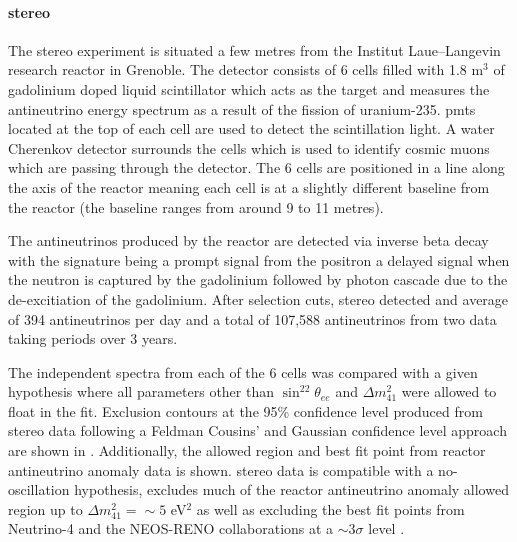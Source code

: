 \newpage
\paragraph{\gls{stereo}}
The \gls{stereo} experiment is situated a few metres from the Institut Laue–Langevin research reactor in Grenoble. The detector consists of 6 cells filled with 1.8 m$^3$ of gadolinium doped liquid scintillator which acts as the target and measures the antineutrino energy spectrum as a result of the fission of uranium-235. \glspl{pmt} located at the top of each cell are used to detect the scintillation light. A water Cherenkov detector surrounds the cells which is used to identify cosmic muons which are passing through the detector. The 6 cells are positioned in a line along the axis of the reactor meaning each cell is at a slightly different baseline from the reactor (the baseline ranges from around 9 to 11 metres). 

The antineutrinos produced by the reactor are detected via inverse beta decay with the signature being a prompt signal from the positron a delayed signal when the neutron is captured by the gadolinium followed by photon cascade due to the de-excitiation of the gadolinium. After selection cuts, \gls{stereo} detected and average of 394 antineutrinos per day and a total of 107,588 antineutrinos from two data taking periods over 3 years.  

The independent spectra from each of the 6 cells was compared with a given hypothesis where all parameters other than $\sin^22\theta_{ee}$ and $\Delta m^2_{41}$ were allowed to float in the fit. Exclusion contours at the 95\% confidence level produced from \gls{stereo} data following a Feldman Cousins' and Gaussian confidence level approach are shown in . Additionally, the allowed region and best fit point from reactor antineutrino anomaly data is shown. \gls{stereo} data is compatible with a no-oscillation hypothesis, excludes much of the reactor antineutrino anomaly allowed region up to $\Delta m^2_{41} = \sim 5$ eV$^2$ as well as excluding the best fit points from Neutrino-4 and the NEOS-RENO collaborations at a $\sim 3\sigma$ level \cite{STEREO}. 

